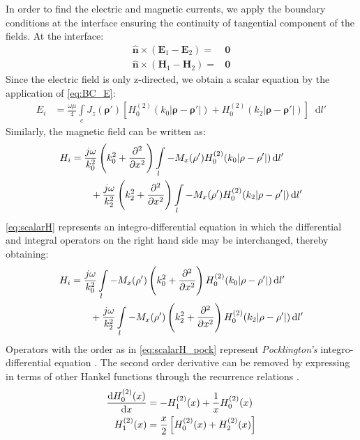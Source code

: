 \documentclass[11pt]{article}
\renewcommand{\v}[1]{\mathbf{#1}} %
\renewcommand{\O}{\omega}  %
\renewcommand{\u}{\mu}  %
\newcommand{\p}{\rho}  %
\newcommand{\x}{\times}  %
\renewcommand{\^}{\hat}  %
\newcommand*\diff{\mathop{}\!\mathrm{d}} %
\begin{document}
In order to find the electric and magnetic currents, we apply the boundary conditions at the interface ensuring the continuity of tangential component of the fields. At the interface:
%
\begin{subequations}
  \begin{align}
    \hat{\v n} \x (\v E_1 - \v E_2) ={}& \v 0
    \label{eq:BC_E}\\
    \hat{\v n} \x (\v H_1 - \v H_2) ={}& \v 0
    \label{eq:BC_H}
  \end{align}
  \label{eq:BC}
\end{subequations}
%
Since the electric field is only z-directed, we obtain a scalar equation by the application of \eqref{eq:BC_E}:
%
\begin{align}
  E_i &= \frac{\O \u}{4} \int\limits_c J_z(\v \p') \left[ H_0^{(2)}(k_0 |\v \p - \v \p'|) + H_0^{(2)}(k_2 |\v \p - \v \p'|)\right] \diff{l'}
  \label{eq:scalarE}
\end{align}
%
Similarly, the magnetic field can be written as:
%
\begin{align}
  H_i &=  \frac{j \O}{k_0^2}\left(k_0^2 +  \pdv[2]{}{x} \right) \int\limits_{l} -M_x(\v \p') H_0^{(2)}(k_0 |\v \p - \v \p'|) \diff{l'} \notag\\
  &\qquad + \frac{j \O}{k_2^2}\left(k_2^2 +  \pdv[2]{}{x} \right) \int\limits_{l} -M_x(\v \p') H_0^{(2)}(k_2 |\v \p - \v \p'|) \diff{l'}
  \label{eq:scalarH}
\end{align}
%
\eqref{eq:scalarH} represents an integro-differential equation in which the differential and integral operators on the right hand side may be interchanged, thereby obtaining:
%
\begin{align}
  H_i &=  \frac{j \O}{k_0^2} \int\limits_{l} -M_x(\v \p') \left(k_0^2 +  \pdv[2]{}{x} \right) H_0^{(2)}(k_0 |\v \p - \v \p'|) \diff{l'} \notag\\
  &\qquad + \frac{j \O}{k_2^2} \int\limits_{l} -M_x(\v \p') \left(k_2^2 +  \pdv[2]{}{x} \right) H_0^{(2)}(k_2 |\v \p - \v \p'|) \diff{l'}
  \label{eq:scalarH_pock}
\end{align}
%
Operators with the order as in \eqref{eq:scalarH_pock} represent \emph{Pocklington's} integro-differential equation \cite{}. The second order derivative can be removed by expressing in terms of other Hankel functions through the recurrence relations \cite[p. 361]{}.
%
\begin{subequations}
  \begin{align}
    \dv{H_0^{(2)}(x)}{x} &= -H_{1}^{(2)}(x) + \frac{1}{x} H_0^{(2)}(x)
    \label{eq:Hankel_ID1}\\
    H_{1}^{(2)}(x)  &= \frac{x}{2} \left[H_{0}^{(2)}(x) + H_{2}^{(2)}(x)\right]
    \label{eq:Hankel_ID2}
  \end{align}
  \label{eq:Hankel_ID}
\end{subequations}
\end{document}
